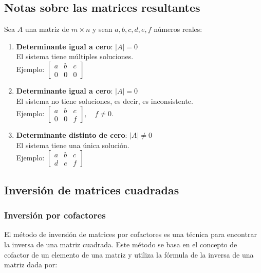 \subsection*{Notas sobre las matrices resultantes}
\label{sec:0_notas_sobre_las_matrices_resultantes}

Sea $A$ una matriz de $m \times n$ y sean $a, b, c, d, e, f$ números reales:

\begin{enumerate}
    \item \textbf{Determinante igual a cero}: $|A| = 0$ \\ El sistema tiene múltiples soluciones. \\ Ejemplo: $\left[ \begin{array}{rr|r} a & b & c \\ 0 & 0 & 0 \end{array} \right]$
    \item \textbf{Determinante igual a cero}: $|A| = 0$ \\ El sistema no tiene soluciones, es decir, es inconsistente. \\ Ejemplo: $\left[ \begin{array}{rr|r} a & b & c \\ 0 & 0 & f \end{array} \right], \quad f \neq 0$.
    \item \textbf{Determinante distinto de cero}: $|A| \neq 0$ \\ El sistema tiene una única solución. \\ Ejemplo: $\left[ \begin{array}{rr|r} a & b & c \\ d & e & f \end{array} \right]$
\end{enumerate}

\subsection*{Inversión de matrices cuadradas}
\label{sec:0_inversion_de_matrices_cuadradas}

\subsubsection*{Inversión por cofactores}
\label{sec:0_inversion_por_cofactores}

El método de inversión de matrices por cofactores es una técnica para encontrar la inversa de una matriz cuadrada. Este método se basa en el concepto de cofactor de un elemento de una matriz y utiliza la fórmula de la inversa de una matriz dada por:

